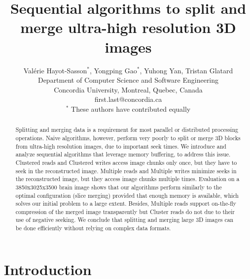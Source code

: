 \documentclass[10pt, conference, compsocconf]{IEEEtran}
\begin{document}
\title{Sequential algorithms to split and merge ultra-high resolution 3D images}

\author{Val\'erie Hayot-Sasson$^*$, Yongping Gao$^*$, Yuhong Yan, Tristan Glatard\\
  Department of Computer Science and Software Engineering\\ Concordia University, Montreal, Quebec, Canada\\
  {first.last}@concordia.ca\\
  $^*$ These authors have contributed equally
  
}

\maketitle

\begin{abstract}
  Splitting and merging data is a requirement for most parallel or
  distributed processing operations. Naive algorithms, however,
  perform very poorly to split or merge 3D blocks from ultra-high
  resolution images, due to important seek times. We introduce and
  analyze sequential algorithms that leverage memory buffering, to
  address this issue. Clustered reads and Clustered writes access
  image chunks only once, but they have to seek in the reconstructed
  image. Multiple reads and Multiple writes minimize seeks in the
  reconstructed image, but they access image chunks multiple
  times. Evaluation on a 3850x3025x3500 brain image shows that our
  algorithms perform similarly to the optimal configuration (slice
  merging) provided that enough memory is available, which solves our
  initial problem to a large extent. Besides, Multiple reads
  support on-the-fly compression of the merged image transparently but
  Cluster reads do not due to their use of negative seeking. We
  conclude that splitting and merging large 3D images can be done
  efficiently without relying on complex data formats.
\end{abstract}


\section{Introduction}
\end{document}
